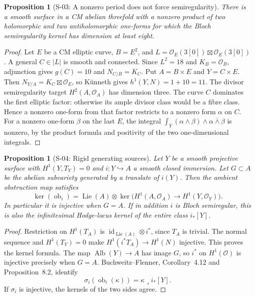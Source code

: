\documentclass[11pt,a4paper]{article}
\newtheorem{proposition}[theorem]{Proposition}
\theoremstyle{definition}
\begin{document}
\begin{proposition}[S-03: A nonzero period does not force semiregularity]
\label{prop:semireg-period-counterexample}
There is a smooth surface in a CM abelian threefold with a nonzero
product of two holomorphic and two antiholomorphic one-forms for
which the Bloch semiregularity kernel has dimension at least eight.
\end{proposition}
\begin{proof}
Let $E$ be a CM elliptic curve, $B=E^2$, and
$L=\mathcal O_E(3[0])\boxtimes\mathcal O_E(3[0])$.
A general $C\in|L|$ is smooth and connected. Since $L^2=18$ and
$K_B=\mathcal O_B$, adjunction gives $g(C)=10$ and
$N_{C/B}=K_C$. Put $A=B\times E$ and $Y=C\times E$.
Then $N_{Y/A}=K_C\boxtimes\mathcal O_E$, so K\"unneth gives
$h^1(Y,N)=1+10=11$. The divisor semiregularity target
$H^2(A,\mathcal O_A)$ has dimension three.
The curve $C$ dominates the first elliptic factor: otherwise its
ample divisor class would be a fibre class. Hence a nonzero one-form
from that factor restricts to a nonzero form $\alpha$ on $C$.
For a nonzero one-form $\beta$ on the last $E$, the integral
$\int_Y(\alpha\wedge\beta)\wedge\overline{\alpha\wedge\beta}$
is nonzero, by the product formula and positivity of the two
one-dimensional integrals.
\end{proof}

\begin{proposition}[S-04: Rigid generating sources]
\label{prop:semireg-rigid-source}
Let $Y$ be a smooth projective surface with $H^1(Y,T_Y)=0$ and
$i:Y\hookrightarrow A$ a smooth closed immersion. Let $G\subset A$
be the abelian subvariety generated by a translate of $i(Y)$.
Then the ambient obstruction map satisfies
\[
\ker(\operatorname{ob}_i)=
\operatorname{Lie}(A)\otimes
\ker\bigl(H^1(A,\mathcal O_A)\to H^1(Y,\mathcal O_Y)\bigr).
\]
In particular it is injective when $G=A$. If in addition $i$ is
Bloch semiregular, this is also the infinitesimal Hodge-locus kernel
of the entire class $i_*[Y]$.
\end{proposition}
\begin{proof}
Restriction on $H^1(T_A)$ is $\operatorname{id}_{\operatorname{Lie}(A)}
\otimes i^*$, since $T_A$ is trivial. The normal sequence and
$H^1(T_Y)=0$ make $H^1(i^*T_A)\to H^1(N)$ injective.
This proves the kernel formula. The map $\operatorname{Alb}(Y)\to A$
has image $G$, so $i^*$ on $H^1(\mathcal O)$ is injective precisely
when $G=A$. Buchweitz--Flenner, Corollary~4.12 and Proposition~8.2,
identify
\[
 \sigma_i(\operatorname{ob}_i(\kappa))
 =\kappa\mathbin{\lrcorner}i_*[Y].
\]
If $\sigma_i$ is injective, the kernels of the two sides agree.
\end{proof}
\end{document}

